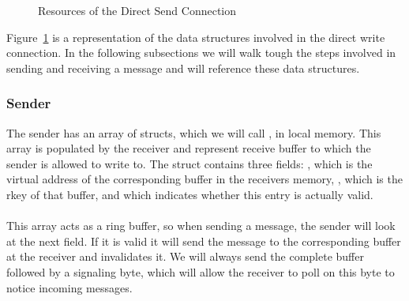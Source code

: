 \begin{figure}[!ht]
\begin{center}
\end{center}
\caption{Resources of the Direct Send Connection}
\label{fig:dirwrite-resources}
\end{figure}

Figure~\ref{fig:dirwrite-resources} is a representation of the data structures involved in the direct write 
connection. In the following subsections we will walk tough the steps involved in sending and receiving a message and
will reference these data structures.

\subsubsection{Sender}

The sender has an array of structs, which we will call , in local memory. This array is populated by the 
receiver and represent receive buffer to which the sender is allowed to write to. The struct contains three fields: 
, which is the virtual address of the corresponding buffer in the receivers memory, , which is the 
rkey of that buffer, and  which indicates whether this entry is actually valid.

\paragraph{} This array acts as a ring buffer, so when sending a message, the sender will look at the next field. If it is
valid it will send the message to the corresponding buffer at the receiver and invalidates it. We will always send the complete
buffer followed by a signaling byte, which will allow the receiver to poll on this byte to notice incoming messages.

